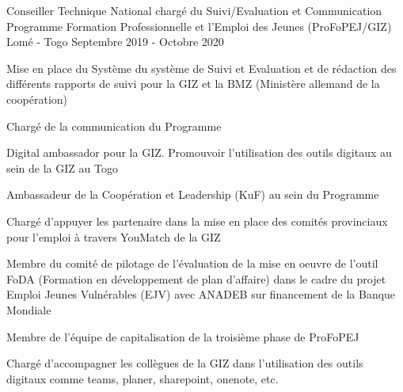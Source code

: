 

\begin{cventries}

  \cventry
    {Conseiller Technique National chargé du Suivi/Evaluation et Communication} %
    {Programme Formation Professionnelle et l'Emploi des Jeunes (ProFoPEJ/GIZ)} %
    {Lomé - Togo} %
    {Septembre 2019 - Octobre 2020} %
    {
      \begin{cvitems} %
    	  \item {Mise en place du Système du système de Suivi et Evaluation et de rédaction des différents rapports de suivi pour la GIZ et la BMZ (Ministère allemand de la coopération)}
    	  \item {Chargé de la communication du Programme}
	      \item {Digital ambassador pour la GIZ. Promouvoir l'utilisation des outils digitaux au sein de la GIZ au Togo}
 	     \item {Ambassadeur de la Coopération et Leadership (KuF) au sein du Programme}
	     \item {Chargé d'appuyer les partenaire dans la mise en place des comités provinciaux pour l'emploi à travers YouMatch de la GIZ}
	     \item {Membre du comité de pilotage de l'évaluation de la mise en oeuvre de l'outil FoDA (Formation en développement de plan d'affaire) dans le cadre du projet Emploi Jeunes Vulnérables (EJV) avec ANADEB sur financement de la Banque Mondiale}
	     \item {Membre de l'équipe de capitalisation de la troisième phase de ProFoPEJ}
	     \item {Chargé d'accompagner les collègues de la GIZ dans l'utilisation des outils digitaux comme teams, planer, sharepoint, onenote, etc.}
      \end{cvitems}
    }


\end{cventries}
